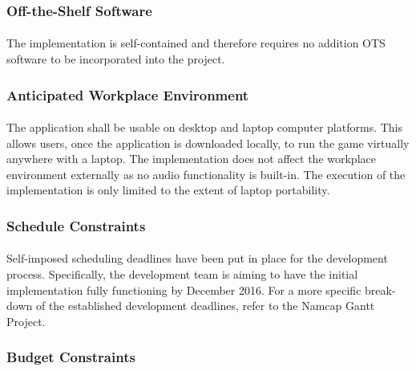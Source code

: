 \documentclass[12pt, titlepage]{article}
\begin{document}
\subsubsection{Off-the-Shelf Software}
\paragraph{}
The implementation is self-contained and therefore requires no addition OTS software to be incorporated into the project.

\subsubsection{Anticipated Workplace Environment}
\paragraph{}
The application shall be usable on desktop and laptop computer platforms. This allows users, once the application is downloaded locally, to run the game virtually anywhere with a laptop. The implementation does not affect the workplace environment externally as no audio functionality is built-in. The execution of the implementation is only limited to the extent of laptop portability.
 
\subsubsection{Schedule Constraints}
\paragraph{}
Self-imposed scheduling deadlines have been put in place for the development process. Specifically, the development team is aiming to have the initial implementation fully functioning by December 2016. For a more specific break-down of the established development deadlines, refer to the Namcap Gantt Project.

\subsubsection{Budget Constraints}
\end{document}
